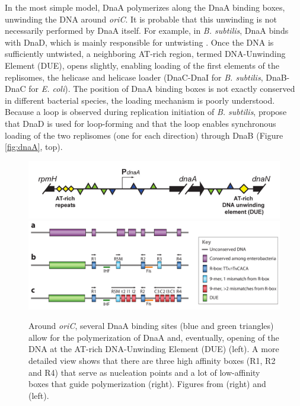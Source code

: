 In the most simple model, DnaA polymerizes along the DnaA binding boxes, unwinding the DNA around \textit{oriC}. It is probable that this unwinding is not necessarily performed by DnaA itself. For example, in \textit{B. subtilis}, DnaA binds with DnaD, which is mainly responsible for untwisting \citep{briggs_chromosomal_2012}. Once the DNA is sufficiently untwisted, a neighboring AT-rich region, termed DNA-Unwinding Element (DUE), opens slightly, enabling loading of the first elements of the replisomes, the helicase and helicase loader (DnaC-DnaI for \textit{B. subtilis}, DnaB-DnaC for \textit{E. coli}). The position of DnaA binding boxes is not exactly conserved in different bacterial species, the loading mechanism is poorly understood. Because a loop is observed during replication initiation of \textit{B. subtilis}, \citet{briggs_chromosomal_2012} propose that DnaD is used for loop-forming and that the loop enables synchronous loading of the two replisomes (one for each direction) through DnaB (Figure \ref{fig:dnaA}, top). 

\begin{figure}[!ht]
	\centering
	\includegraphics[width=0.49\linewidth]{figure/dnaABindingBoxes}
	\includegraphics[width=0.49\linewidth]{figure/dnaABoxes}
	\caption{Around \textit{oriC}, several DnaA binding sites (blue and green triangles) allow for the polymerization of DnaA and, eventually, opening of the DNA at the AT-rich DNA-Unwinding Element (DUE) (left). A more detailed view shows that there are three high affinity boxes (R1, R2 and R4) that serve as nucleation points and a lot of low-affinity boxes that guide polymerization (right). Figures from \citet{leonard_regulation_2011} (right) and \citet{briggs_chromosomal_2012} (left).}
	\label{fig:dnaABoxes}
\end{figure}

